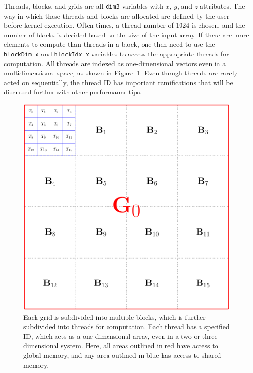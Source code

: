Threads, blocks, and grids are all \texttt{dim3} variables with $x$, $y$, and $z$ attributes.
The way in which these threads and blocks are allocated are defined by the user before kernel execution.
Often times, a thread number of 1024 is chosen, and the number of blocks is decided based on the size of the input array.
If there are more elements to compute than threads in a block, one then need to use the \texttt{blockDim.x} and \texttt{blockIdx.x} variables to access the appropriate threads for computation.
All threads are indexed as one-dimensional vectors even in a multidimensional space, as shown in Figure~\ref{fig:threadsnblocks}.
Even though threads are rarely acted on sequentially, the thread ID has important ramifications that will be discussed further with other performance tips.

\begin{figure}
\includegraphics[width=\textwidth]{data/gpu/gputhreads.pdf}
\caption{Each grid is subdivided into multiple blocks, which is further subdivided into threads for computation. Each thread has a specified ID, which acts as a one-dimensional array, even in a two or three-dimensional system. Here, all areas outlined in red have access to global memory, and any area outlined in blue has access to shared memory. }
\label{fig:threadsnblocks}
\end{figure}

